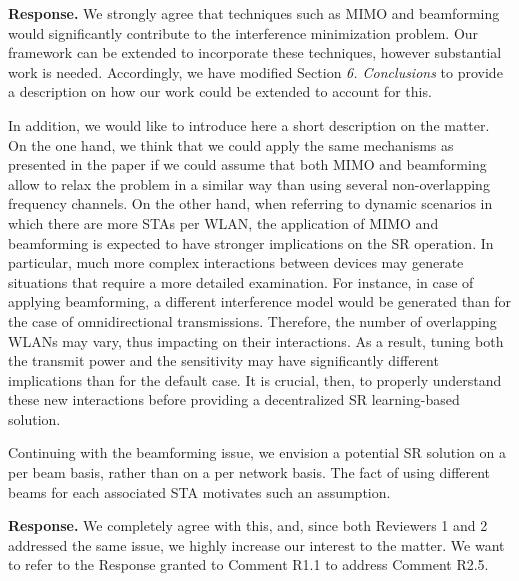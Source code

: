 \documentclass[a4paper,twoside,11pt]{reviewresponse}
\begin{document}
	
	\textbf{Response.} We strongly agree that techniques such as MIMO and beamforming would significantly contribute to the interference minimization problem. Our framework can be extended to incorporate these techniques, however substantial work is needed. Accordingly, we have modified Section \textit{6. Conclusions} to provide a description on how our work could be extended to account for this.
	
	In addition, we would like to introduce here a short description on the matter. On the one hand, we think that we could apply the same mechanisms as presented in the paper if we could assume that both MIMO and beamforming allow to relax the problem in a similar way than using several non-overlapping frequency channels. On the other hand, when referring to dynamic scenarios in which there are more STAs per WLAN, the application of MIMO and beamforming is expected to have stronger implications on the SR operation. In particular, much more complex interactions between devices may generate situations that require a more detailed examination. For instance, in case of applying beamforming, a different interference model would be generated than for the case of omnidirectional transmissions. Therefore, the number of overlapping WLANs may vary, thus impacting on their interactions. As a result, tuning both the transmit power and the sensitivity may have significantly different implications than for the default case. It is crucial, then, to properly understand these new interactions before providing a decentralized SR learning-based solution.
	
	Continuing with the beamforming issue, we envision a potential SR solution on a per beam basis, rather than on a per network basis. The fact of using different beams for each associated STA motivates such an assumption.


	\textbf{Response.} We completely agree with this, and, since both Reviewers 1 and 2 addressed the same issue, we highly increase our interest to the matter. We want to refer to the Response granted to Comment R1.1 to address Comment R2.5.
	
\end{document}

